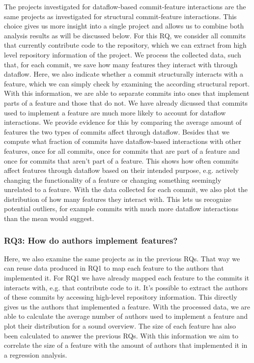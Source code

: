 The projects investigated for dataflow-based commit-feature interactions are the same projects as investigated for structural commit-feature interactions.
This choice gives us more insight into a single project and allows us to combine both analysis results as will be discussed below.
For this RQ, we consider all commits that currently contribute code to the repository, 
which we can extract from high level repository information of the project.
We process the collected data, such that, for each commit, we save how many features they interact with through dataflow.
Here, we also indicate whether a commit structurally interacts with a feature, which we can simply check by examining the according structural report.
With this information, we are able to separate commits into ones that implement parts of a feature and those that do not. 
We have already dicussed that commits used to implement a feature are much more likely to account for dataflow interactions.
We provide evidence for this by comparing the average amount of features the two types of commits affect through dataflow. 
Besides that we compute what fraction of commits have dataflow-based interactions with other features, once for all commits, once for commits that are part of a feature and once for commits that aren't part of a feature.
This shows how often commits affect features through dataflow based on their intended purpose, e.g. actively changing the functionality of a feature or changing something seemingly unrelated to a feature. 
With the data collected for each commit, we also plot the distribution of how many features they interact with.
This lets us recognize potential outliers, for example commits with much more dataflow interactions than the mean would suggest.

\subsubsection*{\textbf{RQ3: How do authors implement features?}}

Here, we also examine the same projects as in the previous RQs.
That way we can reuse data produced in RQ1 to map each feature to the authors that implemented it.
For RQ1 we have already mapped each feature to the commits it interacts with, e.g. that contribute code to it.
It's possible to extract the authors of these commits by accessing high-level repository information.
This directly gives us the authors that implemented a feature.
With the processed data, we are able to calculate the average number of authors used to implement a feature and plot their distribution for a sound overview.
The size of each feature has also been calculated to answer the previous RQs.
With this information we aim to correlate the size of a feature with the amount of authors that implemented it in a regression analysis.

